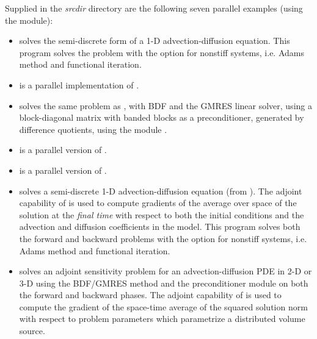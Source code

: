 
\vspace{0.2in}\noindent 
Supplied in the {\em srcdir} directory are
the following seven parallel examples (using the {\nvecp} module):

\begin{itemize}


\item {}
  solves the semi-discrete form of a 1-D advection-diffusion equation.
  \newline
  This program solves the problem with the option for nonstiff systems,
  i.e. Adams method and functional iteration.
\item {}
  is a parallel implementation of .
\item {}
  solves the same problem as , with BDF and the GMRES linear
  solver, using a block-diagonal matrix with banded blocks as a preconditioner, 
  generated by difference quotients, using the module {\cvbbdpre}.


\item {}
  is a parallel version of .
\item {}
  is a parallel version of .

\item {}
  solves a semi-discrete 1-D advection-diffusion equation (from ).
  \newline
  The adjoint capability of {\cvodes} is used to compute gradients
  of the average over space of the solution at the {\em final time} with
  respect to both the initial conditions and the advection and
  diffusion coefficients in the model.
  This program solves both the forward and backward problems with the option 
  for nonstiff systems, i.e. Adams method and functional iteration.
\item {}
  solves an adjoint sensitivity problem for an advection-diffusion PDE in 2-D 
  or 3-D using the BDF/GMRES method and the {\cvbbdpre} preconditioner module
  on both the forward and backward phases.
  \newline
  The adjoint capability of {\cvodes} is used to compute the gradient of the
  space-time average of the squared solution norm with respect to problem 
  parameters which parametrize a distributed volume source.

\end{itemize}


